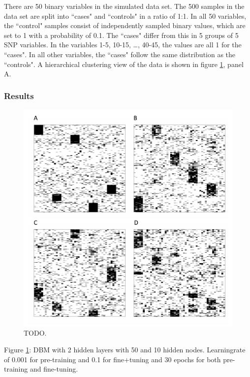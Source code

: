 \documentclass[12pt]{article}
\begin{document}
There are 50 binary variables in the simulated data set.
The 500 samples in the data set are split into ``cases" and ``controls" in a ratio of 1:1.
In all 50 variables, the ``control" samples consist of independently sampled binary values, which are set to 1 with a probability of 0.1.
The ``cases" differ from this in 5 groups of 5 SNP variables.
In the variables 1-5, 10-15, \dots, 40-45, the values are all 1 for the ``cases".
In all other variables, the ``cases" follow the same distribution as the ``controls".
A hierarchical clustering view of the data is shown in figure \ref{fig:distclustersnps}, panel A.


\subsubsection{Results}
 \begin{figure}[h]
   \centering
   \includegraphics[scale=1]{images/hclust.pdf}
   \caption{TODO. }
   \label{fig:distclustersnps}
 \end{figure}
 
Figure \ref{fig:distclustersnps}: DBM with 2 hidden layers with 50 and 10 hidden nodes. Learningrate of 0.001 for pre-training and 0.1 for fine+tuning and 30 epochs for both pre-training and fine-tuning.
 
\end{document}
